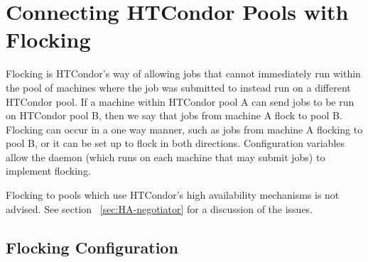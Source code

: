 \section{Connecting HTCondor Pools with Flocking}\label{sec:Flocking}

Flocking is HTCondor's way of allowing jobs that cannot immediately
run within the pool of machines where the job was
submitted to instead run on a different HTCondor pool. 
If a machine within HTCondor pool A can send jobs to be run on HTCondor pool B,
then we say that jobs from machine A flock to pool B.
Flocking can occur in a one way manner,
such as jobs from machine A flocking to pool B,
or it can be set up to flock in both directions. 
Configuration variables allow the
 daemon (which runs on each machine
that may submit jobs) to implement flocking.

\Note Flocking to pools which use HTCondor's high availability mechanisms
is not advised.
See section ~\ref{sec:HA-negotiator} 
for a discussion of the issues.


\subsection{\label{sec:Configure-Flocking}Flocking Configuration}

